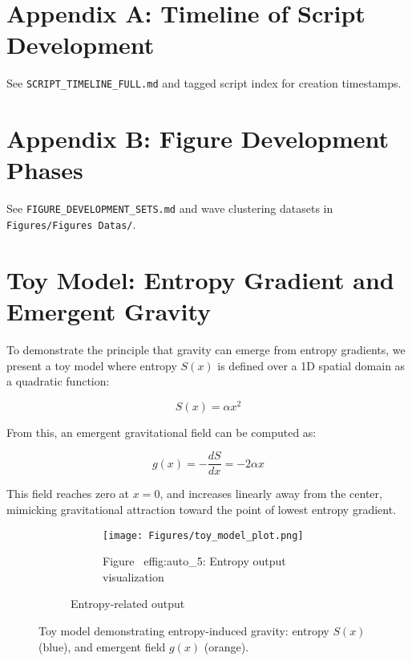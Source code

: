 \documentclass[12pt]{article}
\begin{document}
\appendix

\section{Appendix A: Timeline of Script Development}

See \texttt{SCRIPT\_TIMELINE\_FULL.md} and tagged script index for creation timestamps.

\section{Appendix B: Figure Development Phases}

See \texttt{FIGURE\_DEVELOPMENT\_SETS.md} and wave clustering datasets in \texttt{Figures/Figures~Datas/}.

\tableofcontents

\section{Toy Model: Entropy Gradient and Emergent Gravity}

To demonstrate the principle that gravity can emerge from entropy gradients, we present a toy model where entropy \( S(x) \) is defined over a 1D spatial domain as a quadratic function:

\[
S(x) = \alpha x^2
\]

From this, an emergent gravitational field can be computed as:

\[
g(x) = -\frac{dS}{dx} = -2\alpha x
\]

This field reaches zero at \( x = 0 \), and increases linearly away from the center, mimicking gravitational attraction toward the point of lowest entropy gradient.

\begin{figure}[H]
    \centering
    \begin{figure}[H]
\centering
\begin{figure}[H]
\centering
\texttt{[image: Figures/toy\_model\_plot.png]}
\caption{Figure~
ef{fig:auto_5}: Entropy output visualization}
\label{fig:auto_5}
\end{figure}
\caption{Entropy-related output}
\label{fig:Figures_toy_model_plot_png}
\end{figure}

    \caption{Toy model demonstrating entropy-induced gravity: entropy \ensuremath{S(x)} (blue), and emergent field \ensuremath{g(x)} (orange).}
    \label{fig:toy_model}
\end{figure}
\end{document}
